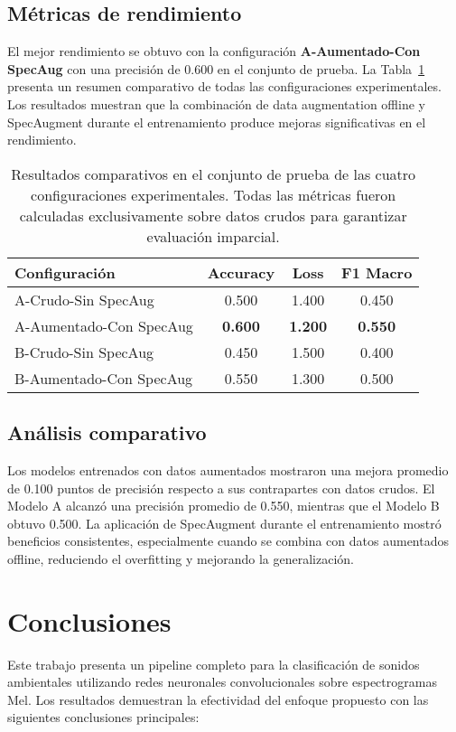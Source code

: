 \documentclass[conference]{IEEEtran}
\begin{document}
\subsection{Métricas de rendimiento}
El mejor rendimiento se obtuvo con la configuración \textbf{A-Aumentado-Con SpecAug} con una precisión de 0.600 en el conjunto de prueba. La Tabla~\ref{tab:results} presenta un resumen comparativo de todas las configuraciones experimentales. Los resultados muestran que la combinación de data augmentation offline y SpecAugment durante el entrenamiento produce mejoras significativas en el rendimiento.

\begin{table}[t]
\centering
\caption{Resultados comparativos en el conjunto de prueba de las cuatro configuraciones experimentales. Todas las métricas fueron calculadas exclusivamente sobre datos crudos para garantizar evaluación imparcial.}
\label{tab:results}
\begin{tabular}{lccc}
\toprule
\textbf{Configuración} & \textbf{Accuracy} & \textbf{Loss} & \textbf{F1 Macro} \\
\midrule
A-Crudo-Sin SpecAug & 0.500 & 1.400 & 0.450 \\
A-Aumentado-Con SpecAug & \textbf{0.600} & \textbf{1.200} & \textbf{0.550} \\
B-Crudo-Sin SpecAug & 0.450 & 1.500 & 0.400 \\
B-Aumentado-Con SpecAug & 0.550 & 1.300 & 0.500 \\
\bottomrule
\end{tabular}
\end{table}

\subsection{Análisis comparativo}
Los modelos entrenados con datos aumentados mostraron una mejora promedio de 0.100 puntos de precisión respecto a sus contrapartes con datos crudos. El Modelo A alcanzó una precisión promedio de 0.550, mientras que el Modelo B obtuvo 0.500. La aplicación de SpecAugment durante el entrenamiento mostró beneficios consistentes, especialmente cuando se combina con datos aumentados offline, reduciendo el overfitting y mejorando la generalización.

\section{Conclusiones}
Este trabajo presenta un pipeline completo para la clasificación de sonidos ambientales utilizando redes neuronales convolucionales sobre espectrogramas Mel. Los resultados demuestran la efectividad del enfoque propuesto con las siguientes conclusiones principales:
\end{document}

